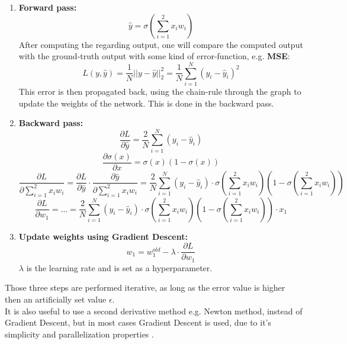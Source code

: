   \begin{enumerate}
   \item \textbf{Forward pass:}
  \begin{equation}
   \hat{y} = \sigma(\sum_{i=1}^{2}x_iw_i)
  \end{equation}
  After computing the regarding output, one will compare the computed output with the ground-truth output with some kind of error-function, e.g. \textbf{MSE}:
  \begin{equation} \label{equation::mse}
   L(y,\hat{y}) = \frac{1}{N}||y-\hat{y}||_2^2 = \frac{1}{N}\sum_{i=1}^{N}(y_i-\hat{y}_i)^2
  \end{equation}    
  This error is then propagated back, using the chain-rule through the
  graph to update the weights of the network. This is done in the backward pass.\\
  \item \textbf{Backward pass:}
  \begin{equation}
   \frac{\partial L}{\partial \hat{y}} = \frac{2}{N}\sum_{i=1}^{N}(y_i-\hat{y}_i)
  \end{equation}
  \begin{equation} \label{equation::sigma_derivative}
   \frac{\partial \sigma(x)}{\partial x} = \sigma(x)(1-\sigma(x))
  \end{equation}
  \begin{equation}
   \frac{\partial L}{\partial \sum_{i=1}^{2}x_iw_i} = \frac{\partial L}{\partial \hat{y}} \cdot \frac{\partial \hat{y}}{\partial \sum_{i=1}^{2}x_iw_i} = \frac{2}{N}\sum_{i=1}^{N}(y_i-\hat{y}_i) \cdot
   \sigma(\sum_{i=1}^{2}x_iw_i)(1-\sigma(\sum_{i=1}^{2}x_iw_i))
  \end{equation}
  \begin{equation}
   \frac{\partial L}{\partial w_1} = \ldots = \frac{2}{N}\sum_{i=1}^{N}(y_i-\hat{y}_i) \cdot \sigma(\sum_{i=1}^{2}x_iw_i)(1-\sigma(\sum_{i=1}^{2}x_iw_i)) \cdot x_1
  \end{equation}
  \item \textbf{Update weights using Gradient Descent:}
  \begin{equation}
   w_1 = w_1^{old} - \lambda \cdot \frac{\partial L}{\partial w_1}
  \end{equation}
  $\lambda$ is the learning rate and is set as a hyperparameter.
  \end{enumerate}
  Those three steps are performed iterative, as long as the error value is higher then an artificially set value $\epsilon$.\\
  It is also useful to use a second derivative method e.g. Newton method, instead of Gradient Descent, but in most cases Gradient Descent is used,
  due to it's simplicity and parallelization properties \cite{Rumelhart1986}.
 
